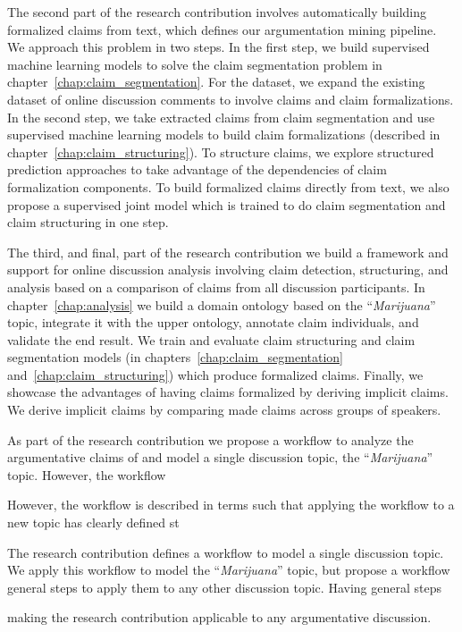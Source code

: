 The second part of the research contribution involves automatically building
formalized claims from text, which defines our argumentation mining pipeline.
We approach this problem in two steps.  In the first step, we build supervised
machine learning models to solve the claim segmentation problem in
chapter~\ref{chap:claim_segmentation}.  For the dataset, we expand the existing
dataset of online discussion comments \citep{hasan2014you} to involve claims
and claim formalizations.  In the second step, we take extracted claims from
claim segmentation and use supervised machine learning models to build claim
formalizations (described in chapter~\ref{chap:claim_structuring}). To
structure claims, we explore structured prediction approaches to take advantage
of the dependencies of claim formalization components.  To build formalized
claims directly from text, we also propose a supervised joint model which is
trained to do claim segmentation and claim structuring in one step. 

The third, and final, part of the research contribution we build a framework
and support for online discussion analysis involving claim detection,
structuring, and analysis based on a comparison of claims from all discussion
participants. In chapter~\ref{chap:analysis} we build a domain ontology based
on the ``\emph{Marijuana}'' topic, integrate it with the upper ontology,
annotate claim individuals, and validate the end result. We train and
evaluate claim structuring and claim segmentation models (in
chapters~\ref{chap:claim_segmentation} and~\ref{chap:claim_structuring}) which
produce formalized claims. Finally, we showcase the advantages of having claims
formalized by deriving implicit claims.  We derive implicit claims by comparing
made claims across groups of speakers. 

As part of the research contribution we propose a workflow to analyze
the argumentative claims of 
and model a single discussion topic, the ``\emph{Marijuana}'' topic. 
However, the workflow 


However, 
the workflow is described in terms such that applying the workflow
to a new topic has clearly defined st

The research contribution defines a workflow to model 
a single discussion topic. We apply this workflow to model the 
``\emph{Marijuana}'' topic, but propose a workflow general steps to apply
them to any other discussion topic. Having general steps 

making the research contribution
applicable to any argumentative discussion.

